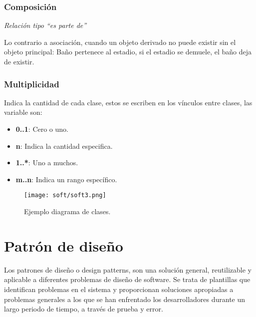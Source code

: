 \documentclass[
	12pt, %
	fleqn, %
	a4paper, %
	oneside, %
]{LegrandOrangeBook}
\begin{document}
\subsubsection*{Composición}
\begin{flushright}
\textit{Relación tipo ``es parte de''}
\end{flushright}
Lo contrario a asociación, cuando un objeto derivado no puede existir sin el objeto principal: Baño pertenece al estadio, si el estadio se demuele, el baño deja de existir.
\subsubsection{Multiplicidad}
Indica la cantidad de cada clase, estos se escriben en los vínculos entre clases, las variable son:
\begin{itemize}
\item \textbf{0..1}: Cero o uno.
\item \textbf{n}: Indica la cantidad especifica.
\item \textbf{1..*}: Uno a muchos.
\item \textbf{m..n}: Indica un rango específico.
\end{itemize}
\begin{figure}[H]
\centering
\texttt{[image: soft/soft3.png]}
\caption{Ejemplo diagrama de clases.}
\end{figure}
\section{Patrón de diseño}
Los patrones de diseño o design patterns, son una solución general, reutilizable y aplicable a diferentes problemas de diseño de software. Se trata de plantillas que identifican problemas en el sistema y proporcionan soluciones apropiadas a problemas generales a los que se han enfrentado los desarrolladores durante un largo periodo de tiempo, a través de prueba y error.
\end{document}
